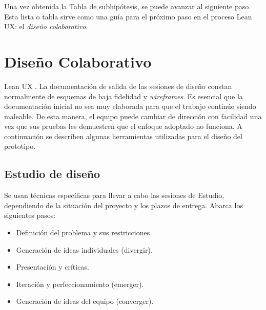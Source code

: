 Una vez obtenida la Tabla de subhipótesis, se puede avanzar al siguiente paso. Esta lista o tabla sirve como una guía para el próximo paso en el proceso Lean UX: el \textit{diseño colaborativo}.

\clearpage
\section{Diseño Colaborativo}
Lean UX\citep{Gothelf2013} . La documentación de salida de las sesiones de diseño constan normalmente de esquemas de baja fidelidad y \textit{wireframes}. Es esencial que la documentación inicial no sea muy elaborada para que el trabajo continúe siendo maleable. De esta manera, el equipo puede cambiar de dirección con facilidad una vez que sus pruebas les demuestren que el enfoque adoptado no funciona. A continuación se describen algunas herramientas utilizadas para el diseño del prototipo.

\subsection{Estudio de diseño}
 Se usan técnicas específicas para llevar a cabo las sesiones de Estudio, dependiendo de la situación del proyecto y los plazos de entrega. Abarca los siguientes pasos:
\begin{itemize}
    \item Definición del problema y sus restricciones. 
    \item Generación de ideas individuales (divergir). 
    \item Presentación y críticas. 
    \item Iteración y perfeccionamiento (emerger). 
    \item Generación de ideas del equipo (converger).
\end{itemize}


